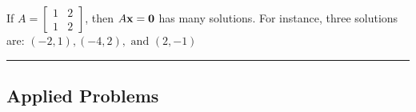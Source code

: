  
 
 
 

\begin{example}
If $ A = \begin{bmatrix}  1& 2\\ 1 & 2  \end{bmatrix} $, then $A {\bf x} = {\bf 0}$ has many solutions.  For instance, three solutions are:  $(-2, 1), (-4, 2), \text{ and } (2, -1)$
\end{example}

\rule[0.01in]{\textwidth}{0.0025in}



\subsection{Applied Problems}

